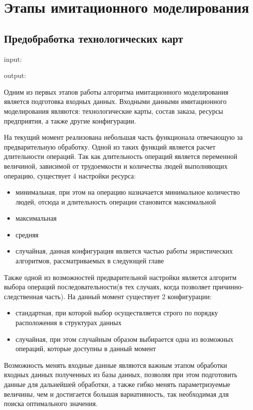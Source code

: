\section{Этапы имитационного моделирования}

\subsection{Предобработка технологических карт}

input:

output:

Одним из первых этапов работы алгоритма имитационного моделирования является подготовка входных данных. Входными данными имитационного моделирования являются: технологические карты, состав заказа, ресурсы предприятия, а также другие конфигурации.

На текущий момент реализована небольшая часть функционала отвечающую за предварительную обработку. Одной из таких функций является расчет длительности операций. Так как длительность операций является переменной величиной, зависимой от трудоемкости и количества людей выполняющих операцию, существует 4 настройки ресурса:

\begin{itemize}
    \item минимальная, при этом на операцию назначается минимальное количество людей, отсюда и длительность операции становится максимальной
    \item максимальная
    \item средняя
    \item случайная, данная конфигурация является частью работы эвристических алгоритмов, рассматриваемых в следующей главе
\end{itemize}

Также одной из возможностей предварительной настройки является алгоритм выбора операций последовательности(в тех случаях, когда позволяет причинно-следственная часть). На данный момент существует 2 конфигурации:

\begin{itemize}
    \item стандартная, при которой выбор осуществляется строго по порядку расположения в структурах данных
    \item случайная, при этом случайным образом выбирается одна из возможных операций, которые доступны в данный момент 
\end{itemize}

Возможность менять входные данные являются важным этапом обработки входных данных полученных из базы данных, позволяя при этом подготовить данные для дальнейшей обработки, а также гибко менять параметризуемые величины, чем и достигается большая вариативность, так необходимая для поиска оптимального значения. 


